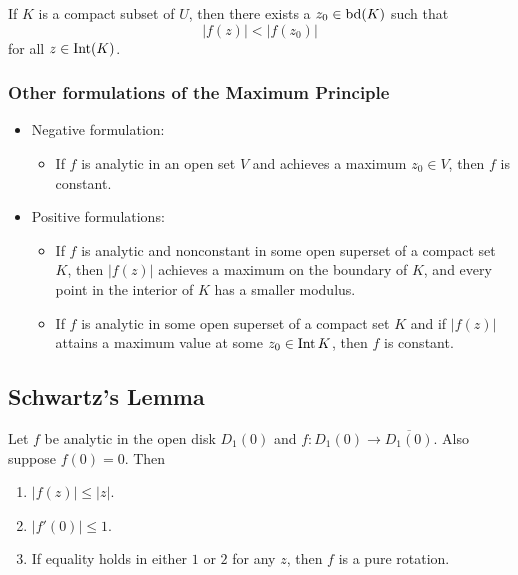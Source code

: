 \begin{cor}
    If $K$ is a compact subset of $U$, then there exists a
    $z_0 \in \operatorname{bd}(K)$ such that
    \[ |f(z)| < |f(z_0)| \]
    for all $z \in \operatorname{Int}(K)$.
\end{cor}

\subsubsection{Other formulations of the Maximum Principle}
\begin{itemize}
    \item Negative formulation:
        \begin{itemize}
            \item If $f$ is analytic in an open set $V$ and achieves
                a maximum $z_0 \in V$, then $f$ is constant.
        \end{itemize}

    \item Positive formulations:
        \begin{itemize}
            \item If $f$ is analytic and nonconstant in some
                open superset of a compact set $K$, then
                $|f(z)|$ achieves a maximum on the boundary of $K$,
                and every point in the interior of $K$ has a
                smaller modulus.
            \item If $f$ is analytic in some open superset of a
                compact set $K$ and if $|f(z)|$ attains a 
                maximum value at some $z_0 \in \operatorname{Int} K$,
                then $f$ is constant.
        \end{itemize}
\end{itemize}

\subsection{Schwartz's Lemma}

\begin{lemma}
    Let $f$ be analytic in the open disk $D_1(0)$ and 
    $f : D_1(0) \to \overline{D_1(0)}$.
    Also suppose $f(0)=0$.
    Then
    \begin{enumerate}
        \item $|f(z)| \le |z|$.
        \item $|f'(0)| \le 1$.
        \item If equality holds in either $1$ or $2$ for any $z$,
            then $f$ is a pure rotation.
    \end{enumerate}
\end{lemma}

